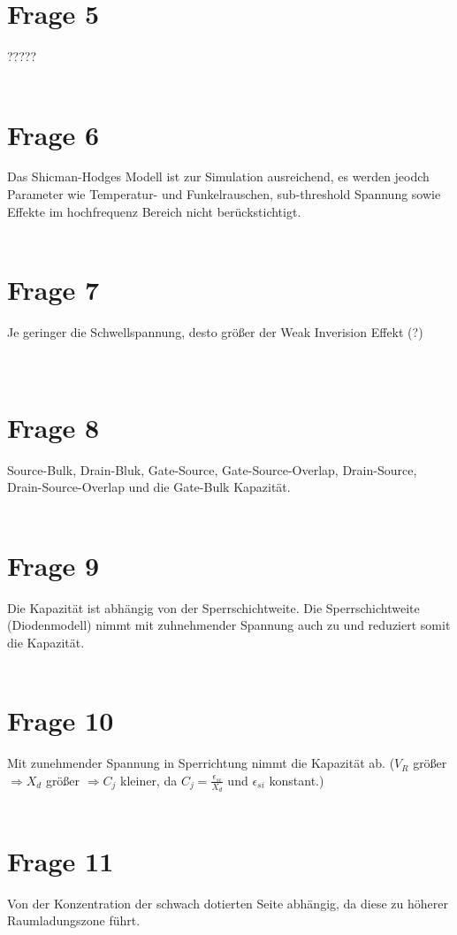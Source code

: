 \documentclass[a4paper]{scrartcl}
\begin{document}
\section*{Frage 5}
?????
~\\
~\\
\section*{Frage 6}
Das Shicman-Hodges Modell ist zur Simulation ausreichend, es werden jeodch Parameter wie Temperatur- und Funkelrauschen, sub-threshold Spannung sowie Effekte im hochfrequenz Bereich nicht berückstichtigt.
~\\
~\\
\section*{Frage 7}
Je geringer die Schwellspannung, desto größer der Weak Inverision Effekt (?)\\

~\\
~\\
\section*{Frage 8}
Source-Bulk, Drain-Bluk, Gate-Source, Gate-Source-Overlap, Drain-Source, Drain-Source-Overlap und die Gate-Bulk Kapazität.
~\\
~\\
\section*{Frage 9}
Die Kapazität ist abhängig von der Sperrschichtweite. Die Sperrschichtweite (Diodenmodell) nimmt mit zuhnehmender Spannung auch zu und reduziert somit die Kapazität.
~\\
~\\
\section*{Frage 10}
Mit zunehmender Spannung in Sperrichtung nimmt die Kapazität ab. ($V_R$ größer $\Rightarrow X_d$ größer $\Rightarrow C_j$ kleiner, da $C_j = \frac{\epsilon_{si}}{X_d}$ und $\epsilon_{si}$ konstant.)
~\\
~\\
\section*{Frage 11}
Von der Konzentration der schwach dotierten Seite abhängig, da diese zu höherer Raumladungszone führt.
\end{document}
